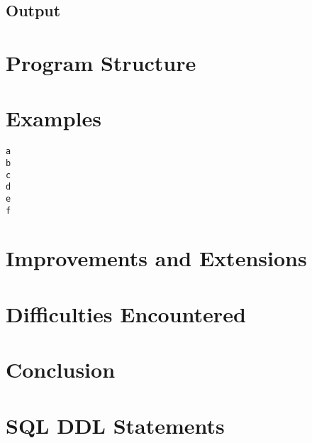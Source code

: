 \documentclass[12pt, A4, titlepage]{article}
\begin{document}
\subsection{Output}



\section{Program Structure}




\section{Examples}



\begin{verbatim}
a
b
c
d
e
f
\end{verbatim}


\section{Improvements and Extensions}



\section{Difficulties Encountered}



\section{Conclusion}

\appendix

\newpage
\section{SQL DDL Statements}
\end{document}

